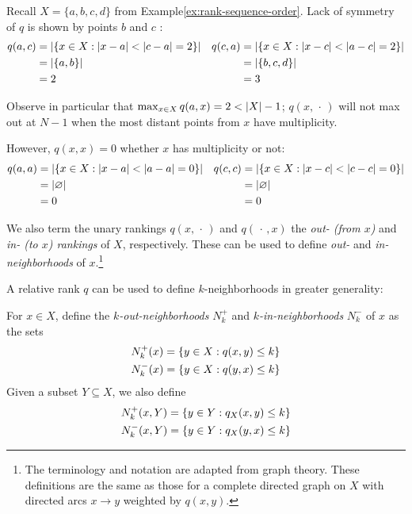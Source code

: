 \documentclass{article}
\begin{document}
\begin{example}\label{ex:relative-rank}
    Recall $X=\{a,b,c,d\}$ from Example\nbs\ref{ex:rank-sequence-order}.
    Lack of symmetry of $q$ is shown by points $b$ and $c$ :
    \begin{align*}
        q(a,c) &= \lvert \{x \in X : \lvert x-a\rvert < \lvert c-a\rvert = 2\}\rvert &
        q(c,a) &= \lvert \{x \in X : \lvert x-c\rvert < \lvert a-c\rvert = 2\}\rvert \\
               &= \lvert \{a, b\}\rvert &&= \lvert \{b, c, d\}\rvert \\
               &= 2 &&= 3
    \end{align*}

    Observe in particular that $\max_{x\in X}{q(a,x)}=2<\lvert X\rvert-1$; $q(x,\,\cdot\,)$ will not max out at $N-1$ when the most distant points from $x$ have multiplicity.

    However, $q(x,x) = 0$ whether $x$ has multiplicity or not:
    \begin{align*}
        q(a,a) &= \lvert \{x \in X : \lvert x-a\rvert < \lvert a-a\rvert = 0\}\rvert &
        q(c,c) &= \lvert \{x \in X : \lvert x-c\rvert < \lvert c-c\rvert = 0\}\rvert \\
               &= \lvert \varnothing\rvert &&= \lvert \varnothing\rvert \\
               &= 0 &&= 0
    \end{align*}
\end{example}

We also term the unary rankings \(q(x,\,\cdot\,)\) and
\(q(\,\cdot\,,x)\) the \emph{out- (from $x$)} and
\emph{in- (to $x$) rankings} of \(X\), respectively. These can be used
to define \emph{out-} and \emph{in-neighborhoods} of \(x\).\footnote{The
  terminology and notation are adapted from graph theory. These
  definitions are the same as those for a complete directed graph on
  \(X\) with directed arcs \(x\to y\) weighted by \(q(x,y)\).}

A relative rank \(q\) can be used to define \(k\)-neighborhoods in
greater generality:

\begin{definition}
    For $x \in X$, define the \emph{$k$-out-neighborhoods} $N^+_k$ and \emph{$k$-in-neighborhoods} $N^-_k$ of $x$ as the sets
    \begin{align*}
        & N^+_k(x)=\{y\in X : q(x,y)\leq k\} \\
        & N^-_k(x)=\{y\in X : q(y,x)\leq k\}
    \end{align*}
    Given a subset $Y \subseteq X$, we also define
    \begin{align*}
        & N^+_k(x,Y)=\{y\in Y : q_X(x,y)\leq k\} \\
        & N^-_k(x,Y)=\{y\in Y : q_X(y,x)\leq k\}
    \end{align*}
\end{definition}
\end{document}
